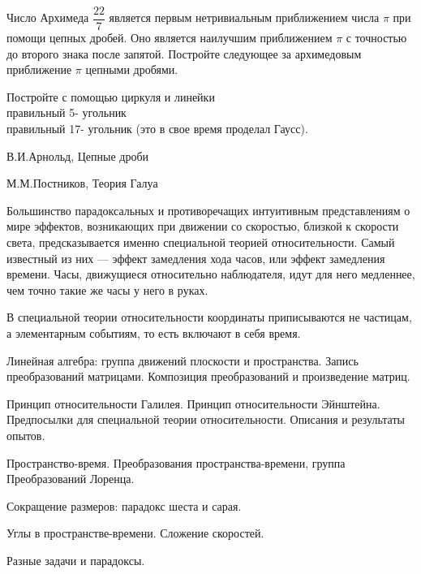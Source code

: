 \documentclass[a4paper,12pt]{article}
\begin{document}
 Число Архимеда $\dfrac{22}{7}$ является первым нетривиальным приближением числа
 $\pi$ при помощи цепных дробей. Оно является наилучшим приближением $\pi$  с точностью до второго
 знака после запятой. Постройте следующее за архимедовым приближение $\pi$ цепными дробями.

  Постройте с помощью циркуля и линейки\\
 правильный 5- угольник\\
 правильный 17- угольник (это в свое время проделал Гаусс).


В.И.Арнольд, Цепные дроби

М.М.Постников, Теория Галуа















\newpage
{}


Большинство парадоксальных и противоречащих интуитивным представлениям о мире эффектов, возникающих при движении со скоростью, близкой к скорости света, предсказывается именно специальной теорией относительности. Самый известный из них — эффект замедления хода часов, или эффект замедления времени. Часы, движущиеся относительно наблюдателя, идут для него медленнее, чем точно такие же часы у него в руках.

В специальной теории относительности координаты приписываются не частицам, а элементарным событиям, то есть включают в себя время.

\begin{nums}{-3}
\item Линейная алгебра: группа движений плоскости и пространства. Запись преобразований матрицами. Композиция преобразований и произведение матриц.
\item Принцип относительности Галилея. Принцип относительности Эйнштейна. Предпосылки  для специальной теории относительности. Описания и результаты опытов.
\item Пространство-время. Преобразования пространства-времени, группа Преобразований Лоренца.
\item Сокращение размеров: парадокс шеста и сарая.
\item Углы в пространстве-времени. Сложение скоростей.
\item Разные задачи и парадоксы.
\end{nums}
\end{document}
